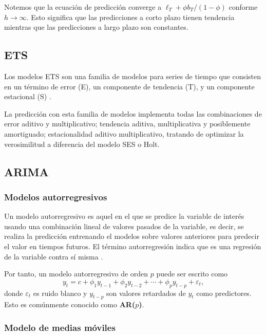 Notemos que la ecuación de predicción converge a $\ell_{T}+\phi b_{T} /(1-\phi)$ conforme $h \rightarrow \infty$. Esto significa que las predicciones a corto plazo tienen tendencia mientras que las predicciones a largo plazo son constantes.

\subsection{ETS}

Los modelos ETS son una familia de modelos para series de tiempo que consisten en un término de error (E), un componente de tendencia (T), y un componente estacional (S) \parencite{ETSModelsStatsmodels}.

La predicción con esta familia de modelos implementa todas las combinaciones de error aditivo y multiplicativo; tendencia aditiva, multiplicativa y posiblemente amortiguado; estacionalidad aditivo multiplicativo, tratando de optimizar la verosimilitud a diferencia del modelo SES o Holt.


\subsection{ARIMA}

\subsubsection{Modelos autorregresivos}

Un modelo autorregresivo es aquel en el que se predice la variable de interés usando una combinación lineal de valores pasados de la variable, es decir, se realiza la predicción entrenando el modelos sobre valores anteriores para predecir el valor en tiempos futuros. El término autorregresión indica que es una regresión de la variable contra sí misma \parencite{hyndmanForecastingPrinciplesPractice2018}.

Por tanto, un modelo autorregresivo de orden $p$ puede ser escrito como 
\[ y_{t}=c+\phi_{1} y_{t-1}+\phi_{2} y_{t-2}+\cdots+\phi_{p} y_{t-p}+\varepsilon_{t},\]
donde $\varepsilon_{t}$ es ruido blanco y $y_{t-p}$ son valores retardados de $y_t$ como predictores. Esto es comúnmente conocido como \textbf{AR($p$)}.

\subsubsection{Modelo de medias móviles}

